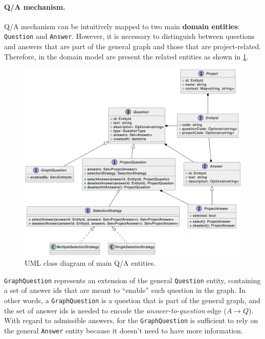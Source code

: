 \documentclass[12pt,a4paper,openright,twoside]{book}
\begin{document}
\paragraph{\ac{Q/A} mechanism.}

\ac{Q/A} mechanism can be intuitively mapped to two main \textbf{domain entities}: \texttt{Question} and \texttt{Answer}.
%
However, it is necessary to distinguish between questions and answers that are part of the general graph and those that are project-related.
%
Therefore, in the domain model are present the related entities as shown in \cref{fig:entities}.

\begin{figure}
    \centering
    \includegraphics[width=\linewidth]{figures/diagrams/entities.png}
    \caption{
        UML class diagram of main \ac{Q/A} entities.
    }
    \label{fig:entities}
\end{figure}

\texttt{GraphQuestion} represents an extension of the general \texttt{Question} entity, containing a set of answer ids that are meant to ``enable'' such question in the graph.
%
In other words, a \texttt{GraphQuestion} is a question that is part of the general graph, and the set of answer ids is needed to encode the \textit{answer-to-question} edge ($A \to Q$).
%
With regard to admissible answers, for the \texttt{GraphQuestion} is sufficient to rely on the general \texttt{Answer} entity because it doesn't need to have more information.
\end{document}
